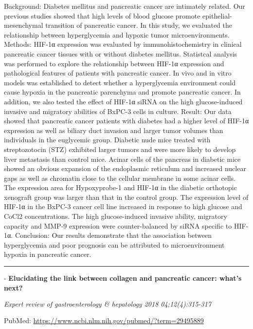 \documentclass[]{article}
\begin{document}
Background: Diabetes mellitus and pancreatic cancer are intimately
related. Our previous studies showed that high levels of blood glucose
promote epithelial-mesenchymal transition of pancreatic cancer. In this
study, we evaluated the relationship between hyperglycemia and hypoxic
tumor microenvironments. Methods: HIF-1α expression was evaluated by
immunohistochemistry in clinical pancreatic cancer tissues with or
without diabetes mellitus. Statistcal analysis was performed to explore
the relationship between HIF-1α expression and pathological features of
patients with pancreatic cancer. In vivo and in vitro models was
established to detect whether a hyperglycemia environment could cause
hypoxia in the pancreatic parenchyma and promote pancreatic cancer. In
addition, we also tested the effect of HIF-1α siRNA on the high
glucose-induced invasive and migratory abilities of BxPC-3 cells in
culture. Result: Our data showed that pancreatic cancer patients with
diabetes had a higher level of HIF-1α expression as well as biliary duct
invasion and larger tumor volumes than individuals in the euglycemic
group. Diabetic nude mice treated with streptozotocin (STZ) exhibited
larger tumors and were more likely to develop liver metastasis than
control mice. Acinar cells of the pancreas in diabetic mice showed an
obvious expansion of the endoplasmic reticulum and increased nuclear
gaps as well as chromatin close to the cellular membrane in some acinar
cells. The expression area for Hypoxyprobe-1 and HIF-1α in the diabetic
orthotopic xenograft group was larger than that in the control group.
The expression level of HIF-1α in the BxPC-3 cancer cell line increased
in response to high glucose and CoCl2 concentrations. The high
glucose-induced invasive ability, migratory capacity and MMP-9
expression were counter-balanced by siRNA specific to HIF-1α.
Conclusion: Our results demonstrate that the association between
hyperglycemia and poor prognosis can be attributed to microenvironment
hypoxia in pancreatic cancer.

{}

{}

\begin{center}\rule{0.5\linewidth}{\linethickness}\end{center}

 - \textbf{Elucidating the link between collagen and pancreatic cancer:
what's next?}

\emph{Expert review of gastroenterology \& hepatology 2018
04;12(4):315-317}

PubMed: \url{https://www.ncbi.nlm.nih.gov/pubmed/?term=29495889}
\end{document}
